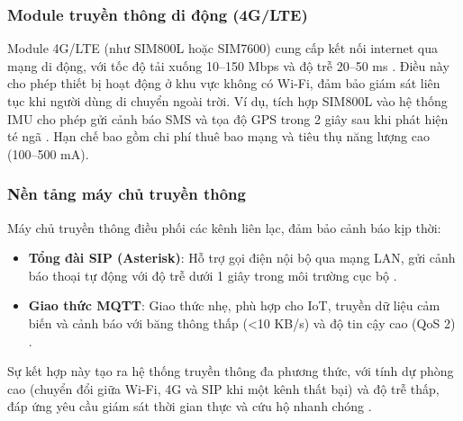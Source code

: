 \subsubsection{Module truyền thông di động (4G/LTE)}
Module 4G/LTE (như SIM800L hoặc SIM7600) cung cấp kết nối internet qua mạng di động, với tốc độ tải xuống 10--150 Mbps và độ trễ 20--50 ms \cite{simcom2023}. Điều này cho phép thiết bị hoạt động ở khu vực không có Wi-Fi, đảm bảo giám sát liên tục khi người dùng di chuyển ngoài trời. Ví dụ, tích hợp SIM800L vào hệ thống IMU cho phép gửi cảnh báo SMS và tọa độ GPS trong 2 giây sau khi phát hiện té ngã \cite{xu2023}. Hạn chế bao gồm chi phí thuê bao mạng và tiêu thụ năng lượng cao (100--500 mA).

\subsubsection{Nền tảng máy chủ truyền thông}
Máy chủ truyền thông điều phối các kênh liên lạc, đảm bảo cảnh báo kịp thời:

\begin{itemize}
    \item \textbf{Tổng đài SIP (Asterisk)}: Hỗ trợ gọi điện nội bộ qua mạng LAN, gửi cảnh báo thoại tự động với độ trễ dưới 1 giây trong môi trường cục bộ \cite{asterisk2023}.
    \item \textbf{Giao thức MQTT}: Giao thức nhẹ, phù hợp cho IoT, truyền dữ liệu cảm biến và cảnh báo với băng thông thấp (<10 KB/s) và độ tin cậy cao (QoS 2) \cite{iotproject2024}.
\end{itemize}

Sự kết hợp này tạo ra hệ thống truyền thông đa phương thức, với tính dự phòng cao (chuyển đổi giữa Wi-Fi, 4G và SIP khi một kênh thất bại) và độ trễ thấp, đáp ứng yêu cầu giám sát thời gian thực và cứu hộ nhanh chóng \cite{multimodal2024}.
